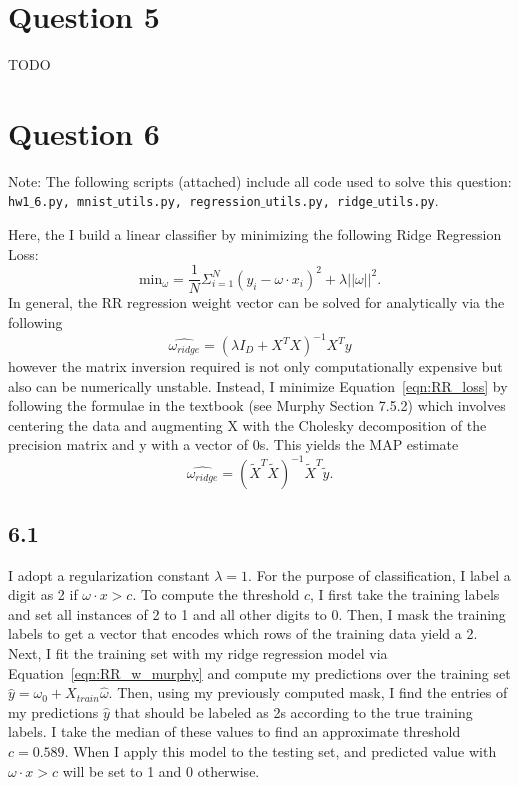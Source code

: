 \documentclass[12pt]{amsart}
\begin{document}

\section*{Question 5}
TODO


\section*{Question 6}

Note: The following scripts (attached) include all code used to solve this question: {\tt hw1$\_$6.py, mnist$\_$utils.py, regression$\_$utils.py, ridge$\_$utils.py}.

Here, the I build a linear classifier by minimizing the following Ridge Regression Loss:
\begin{equation} \label{eqn:RR_loss}
\text{min}_{\omega} = \frac{1}{N} \Sigma_{i = 1}^N (y_i - \omega \cdot x_i)^2 + \lambda || \omega ||^2.
\end{equation}
In general, the RR regression weight vector can be solved for analytically via the following
\begin{equation} \label{eqn:RR_w}
\hat{\omega_{ridge}} = (\lambda I_D + X^T X)^{-1} X^T y
\end{equation}
however the matrix inversion required is not only computationally expensive but also can be numerically unstable.  Instead, I minimize Equation~\ref{eqn:RR_loss} by following the formulae in the textbook (see Murphy Section 7.5.2) which involves centering the data and augmenting X with the Cholesky decomposition of the precision matrix and y with a vector of 0s.  This yields the MAP estimate
\begin{equation} \label{eqn:RR_w_murphy}
\hat{\omega_{ridge}} = (\tilde{X}^T \tilde{X})^{-1} \tilde{X}^T \tilde{y}.
\end{equation}

\subsection*{6.1}
I adopt a regularization constant $\lambda = 1$.  For the purpose of classification, I label a digit as 2 if $\omega \cdot x > c$.  To compute the threshold $c$, I first take the training labels and set all instances of 2 to 1 and all other digits to 0.  Then, I mask the training labels to get a vector that encodes which rows of the training data yield a 2.  Next, I fit the training set with my ridge regression model via Equation~\ref{eqn:RR_w_murphy} and compute my predictions over the training set $\hat{y} = \omega_0 + X_{train}\hat{\omega}$.  Then, using my previously computed mask, I find the entries of my predictions $\hat{y}$ that should be labeled as 2s according to the true training labels.  I take the median of these values to find an approximate threshold $c = 0.589$.  When I apply this model to the testing set, and predicted value with $\omega \cdot x > c$ will be set to 1 and 0 otherwise.
\end{document}

